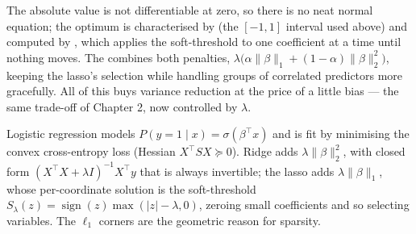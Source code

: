 \documentclass[11pt]{article}
\begin{document}
The absolute value is not differentiable at zero, so there is no neat normal
equation; the optimum is characterised by  (the
$[-1,1]$ interval used above) and computed by ,
which applies the soft-threshold to one coefficient at a time until nothing
moves. The  combines both penalties,
$\lambda\big(\alpha\|\beta\|_1 + (1-\alpha)\|\beta\|_2^2\big)$, keeping the
lasso's selection while handling groups of correlated predictors more
gracefully. All of this buys variance reduction at the price of a little
bias --- the same trade-off of Chapter 2, now controlled by $\lambda$.

\begin{summarybox}
Logistic regression models $P(y=1\mid x) = \sigma(\beta^\top x)$ and is fit by
minimising the convex cross-entropy loss (Hessian $X^\top S X \succeq 0$).
Ridge adds $\lambda\|\beta\|_2^2$, with closed form
$(X^\top X + \lambda I)^{-1}X^\top y$ that is always invertible; the lasso adds
$\lambda\|\beta\|_1$, whose per-coordinate solution is the soft-threshold
$S_\lambda(z)=\operatorname{sign}(z)\max(|z|-\lambda,0)$, zeroing small
coefficients and so selecting variables. The $\ell_1$ corners are the
geometric reason for sparsity.
\end{summarybox}
\end{document}
